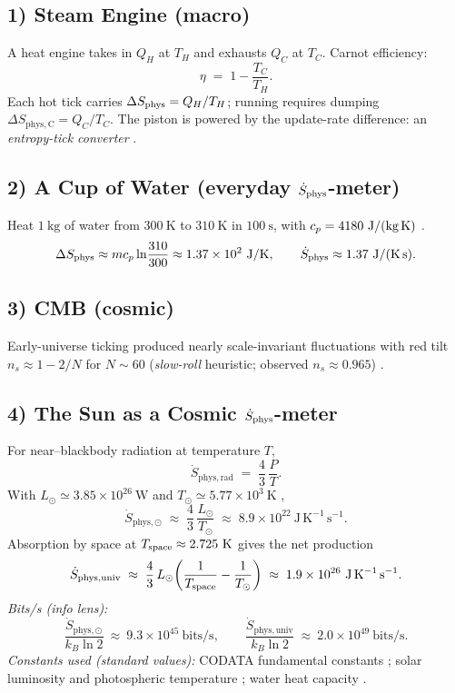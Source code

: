 \documentclass[11pt,oneside]{article}
\begin{document}
\subsection*{1) Steam Engine (macro)}
A heat engine takes in \(Q_H\) at \(T_H\) and exhausts \(Q_C\) at \(T_C\).
Carnot efficiency:
\[
\eta \;=\; 1 - \frac{T_C}{T_H}.
\]
Each hot tick carries \(\Delta S_{\mathrm{phys}} = Q_H/T_H\); running requires dumping \(\Delta S_{\mathrm{phys,C}} = Q_C/T_C\).
The piston is powered by the update-rate difference: an \emph{entropy-tick converter} \cite{callen1985thermodynamics}.

\subsection*{2) A Cup of Water (everyday \(\dot{S}_{\mathrm{phys}}\)-meter)}
Heat \(1~\text{kg}\) of water from \(300\ \text{K}\) to \(310\ \text{K}\) in \(100\ \text{s}\), with \(c_p = 4180\ \text{J/(kg\,K)}\) \cite{crc_handbook}.
\[
\Delta S_{\mathrm{phys}} \approx m c_p \ln\!\frac{310}{300} \approx 1.37\times 10^{2}\ \text{J/K},\qquad
\dot{S}_{\mathrm{phys}} \approx 1.37 \ \text{J/(K\,s)}.
\]

\subsection*{3) CMB (cosmic)}
Early-universe ticking produced nearly scale-invariant fluctuations with red tilt
\(n_s \approx 1 - 2/N\) for \(N \sim 60\) (\emph{slow-roll} heuristic; observed \(n_s\!\approx\!0.965\)) \cite{peebles1993principles,planck2018params}.

\subsection*{4) The Sun as a Cosmic \(\dot{S}_{\mathrm{phys}}\)-meter}
For near–blackbody radiation at temperature \(T\),
\[
\dot{S}_{\mathrm{phys,rad}} \;=\; \frac{4}{3}\,\frac{P}{T}.
\]
With \(L_\odot \simeq 3.85\times 10^{26}\ \mathrm{W}\) and \(T_\odot \simeq 5.77\times 10^3\ \mathrm{K}\) \cite{allen2000},
\[
\dot{S}_{\mathrm{phys},\odot} \;\approx\; \frac{4}{3}\,\frac{L_\odot}{T_\odot}
\;\approx\; 8.9\times 10^{22}\ \mathrm{J\,K^{-1}\,s^{-1}}.
\]
Absorption by space at \(T_{\rm space}\approx 2.725\ \mathrm{K}\) \cite{planck2018params} gives the net production
\[
\dot{S}_{\mathrm{phys,univ}} \;\approx\; \frac{4}{3}\,L_\odot\!\left(\frac{1}{T_{\rm space}} - \frac{1}{T_\odot}\right)
\;\approx\; 1.9\times 10^{26}\ \mathrm{J\,K^{-1}\,s^{-1}}.
\]
\emph{Bits/s (info lens):}
\[
\frac{\dot{S}_{\mathrm{phys},\odot}}{k_B\ln 2}\ \approx\ 9.3\times 10^{45}\ \text{bits/s},\qquad
\frac{\dot{S}_{\mathrm{phys,univ}}}{k_B\ln 2}\ \approx\ 2.0\times 10^{49}\ \text{bits/s}.
\]
\footnotesize\noindent\emph{Constants used (standard values):} CODATA fundamental constants \cite{codata2018}; solar luminosity and photospheric temperature \cite{allen2000}; water heat capacity \cite{crc_handbook}.
\normalsize
\end{document}
